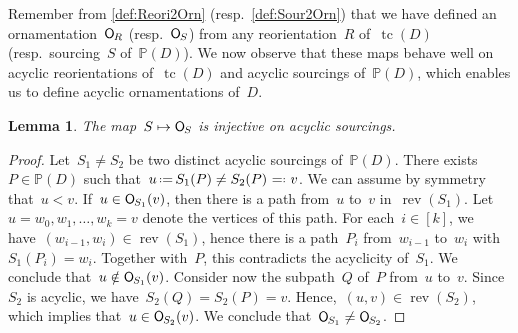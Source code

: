 \documentclass{amsart}
\newtheorem{lemma}[theorem]{Lemma}
\theoremstyle{definition}
\newcommand{\eqdef}{\mbox{\,\raisebox{0.2ex}{\scriptsize\ensuremath{\mathrm:}}\ensuremath{=}\,}} %
\newcommand{\defeq}{\mbox{~\ensuremath{=}\raisebox{0.2ex}{\scriptsize\ensuremath{\mathrm:}} }} %
\DeclareMathOperator{\tc}{tc} %
\newcommand{\Vincent}[1]{\todo[size=\tiny,color=blue!30]{ #1 \\ \hfill --- V.}\,}
\newcommand{\felix}[1]{{\color{orange}#1}}
\newcommand{\mymap}[2]{\mathsf{#1}_{\hspace{-.7pt}#2}}
\newcommand{\orn}[1]{\mymap{O}{#1}}  %
\DeclareMathOperator{\rev}{rev} %
\newcommand{\PP}{\mathbb P} %
\begin{document}
Remember from \cref{def:Reori2Orn} (resp.~\cref{def:Sour2Orn}) that we have defined an ornamentation~$\orn{R}$ (resp.~$\orn{S}$) from any reorientation~$R$ of~$\tc(D)$ (resp.~sourcing~$S$ of~$\PP(D)$).
We now observe that these maps behave well on acyclic reorientations of~$\tc(D)$ and acyclic sourcings of~$\PP(D)$, which enables us to define acyclic ornamentations of~$D$.

\begin{lemma}
\label{lem:ASour2AOrn1}
The map~$S \mapsto \orn{S}$ is injective on acyclic sourcings.
\end{lemma}

\begin{proof}
Let~$S_1 \ne S_2$ be two distinct acyclic sourcings of~$\PP(D)$.
There exists~$P \in \PP(D)$ such that~$u \eqdef S_1(P) \ne S_2(P) \defeq v$.
We can assume by symmetry that~$u < v$.
If~$u \in \orn{S_1}(v)$, then there is a path from~$u$ to~$v$ in~$\rev(S_1)$.
Let~$u = w_0, w_1, \dots, w_k = v$ denote the vertices of this path.
For each~$i \in [k]$, we have~$(w_{i-1},w_i) \in \rev(S_1)$, hence there is a path~$P_i$ from~$w_{i-1}$ to~$w_i$ with~$S_1(P_i) = w_i$.
Together with~$P$, this contradicts the acyclicity of~$S_1$.
We conclude that~${u \notin \orn{S_1}(v)}$.
Consider now the subpath~$Q$ of~$P$ from~$u$ to~$v$.
Since~$S_2$ is acyclic, we have~$S_2(Q) = S_2(P) = v$.
Hence,~$(u,v) \in \rev(S_2)$, which implies that~$u \in \orn{S_2}(v)$.
We conclude that~$\orn{S_1} \ne \orn{S_2}$.
\end{proof}

%
\end{document}
